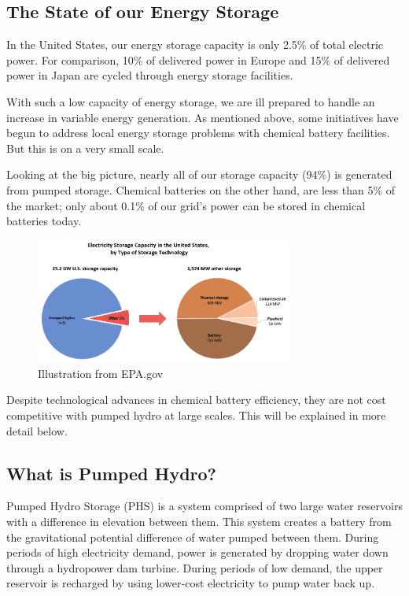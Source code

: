 \documentclass[hidelinks,12pt,a4paper]{article}
\begin{document}
\subsection{The State of our Energy Storage}
In the United States, our energy storage capacity is only 2.5\% of total electric power. For comparison, 10\% of delivered power in Europe and 15\% of delivered power in Japan are cycled through energy storage facilities. \cite{USGridEnergyStorageFactsheet}

With such a low capacity of energy storage, we are ill prepared to handle an increase in variable energy generation. As mentioned above, some initiatives have begun to address local energy storage problems with chemical battery facilities. But this is on a very small scale.

Looking at the big picture, nearly all of our storage capacity (94\%) is generated from pumped storage. \cite{ElectricStorageCapacityInTheUnitedStates} Chemical batteries on the other hand, are less than 5\% of the market; only about 0.1\% of our grid's power can be stored in chemical batteries today.

\begin{figure}[ht!]
    \centering
    \includegraphics[width=0.75\textwidth]{energy-storage-pie-charts.png}
    \caption{Illustration from EPA.gov \cite{ElectricStorageCapacityInTheUnitedStates}}
\end{figure}
\FloatBarrier

Despite technological advances in chemical battery efficiency, they are not cost competitive with pumped hydro at large scales. This will be explained in more detail below.

\subsection{What is Pumped Hydro?}
Pumped Hydro Storage (PHS) is a system comprised of two large water reservoirs with a difference in elevation between them. This system creates a battery from the gravitational potential difference of water pumped between them. During periods of high electricity demand, power is generated by dropping water down through a hydropower dam turbine. During periods of low demand, the upper reservoir is recharged by using lower-cost electricity to pump water back up.
\end{document}
